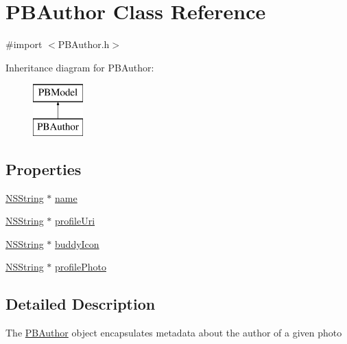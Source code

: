 \hypertarget{interface_p_b_author}{
\section{PBAuthor Class Reference}
\label{interface_p_b_author}
}


{\ttfamily \#import $<$PBAuthor.h$>$}

Inheritance diagram for PBAuthor:\begin{figure}[H]
\begin{center}
\leavevmode
\includegraphics[height=2cm]{interface_p_b_author}
\end{center}
\end{figure}
\subsection*{Properties}
\begin{DoxyCompactItemize}
\item 
\hyperlink{class_n_s_string}{NSString} $\ast$ \hyperlink{interface_p_b_author_afc8ccc6676addc3b49a494b2bf969c68}{name}
\item 
\hyperlink{class_n_s_string}{NSString} $\ast$ \hyperlink{interface_p_b_author_af7d074aa8861356ca9427098d9a97af8}{profileUri}
\item 
\hyperlink{class_n_s_string}{NSString} $\ast$ \hyperlink{interface_p_b_author_ae8e79b8596c2100b5129022d2f1beca2}{buddyIcon}
\item 
\hyperlink{class_n_s_string}{NSString} $\ast$ \hyperlink{interface_p_b_author_a15ca8bbd4cd613fdd6bf4a81006598fa}{profilePhoto}
\end{DoxyCompactItemize}


\subsection{Detailed Description}
The \hyperlink{interface_p_b_author}{PBAuthor} object encapsulates metadata about the author of a given photo 


